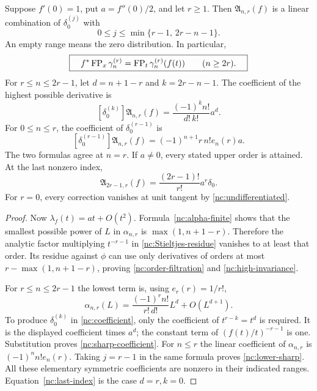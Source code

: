 \begin{theorem}
\label{nc:rigidity}
Suppose $f'(0)=1$, put $a=f''(0)/2$, and let $r\geq1$. Then
$\mathfrak A_{n,r}(f)$ is a linear combination of
$\delta_0^{(j)}$ with
\begin{equation}\label{nc:order-filtration}
 0\leq j\leq\min\{r-1,\,2r-n-1\}.
\end{equation}
An empty range means the zero distribution. In particular,
\begin{equation}\label{nc:high-invariance}
 \boxed{\quad
 f^*\operatorname{FP}_x\gamma_n^{(r)}
      =\operatorname{FP}_t\gamma_n^{(r)}(f(t))\qquad(n\geq2r).
 \quad}
\end{equation}
For $r\leq n\leq2r-1$, let
$d=n+1-r$ and $k=2r-n-1$. The coefficient of the highest possible
derivative is
\begin{equation}\label{nc:sharp-coefficient}
 [\delta_0^{(k)}]\mathfrak A_{n,r}(f)
        =\frac{(-1)^kn!}{d!\,k!}a^d.
\end{equation}
For $0\leq n\leq r$, the coefficient of $\delta_0^{(r-1)}$ is
\begin{equation}\label{nc:lower-sharp}
 [\delta_0^{(r-1)}]\mathfrak A_{n,r}(f)
       =(-1)^{n+1}r\,n!e_n(r)a.
\end{equation}
The two formulas agree at $n=r$. If $a\ne0$, every stated upper
order is attained. At the last nonzero index,
\begin{equation}\label{nc:last-index}
 \mathfrak A_{2r-1,r}(f)
     =\frac{(2r-1)!}{r!}a^r\delta_0.
\end{equation}
For $r=0$, every correction vanishes at unit tangent by
\eqref{nc:undifferentiated}.
\end{theorem}

\begin{proof}
Now $\lambda_f(t)=a t+O(t^2)$. Formula~\eqref{nc:alpha-finite}
shows that the smallest possible power of $L$ in $\alpha_{n,r}$ is
$\max(1,n+1-r)$. Therefore the analytic factor multiplying
$t^{-r-1}$ in \eqref{nc:Stieltjes-residue} vanishes to at least that
order. Its residue against $\phi$ can use only derivatives of orders
at most $r-\max(1,n+1-r)$, proving
\eqref{nc:order-filtration} and \eqref{nc:high-invariance}.

For $r\leq n\leq2r-1$ the lowest term is, using $e_r(r)=1/r!$,
\[
 \alpha_{n,r}(L)
    =\frac{(-1)^rn!}{r!\,d!}L^d+O(L^{d+1}).
\]
To produce $\delta_0^{(k)}$ in \eqref{nc:coefficient}, only the
coefficient of $t^{r-k}=t^d$ is required. It is the displayed
coefficient times $a^d$; the constant term of $(f(t)/t)^{-r-1}$ is
one. Substitution proves \eqref{nc:sharp-coefficient}. For $n\leq r$
the linear coefficient of $\alpha_{n,r}$ is
$(-1)^nn!e_n(r)$. Taking $j=r-1$ in the same formula proves
\eqref{nc:lower-sharp}. All these elementary symmetric coefficients
are nonzero in their indicated ranges. Equation~\eqref{nc:last-index}
is the case $d=r,k=0$.
\end{proof}

